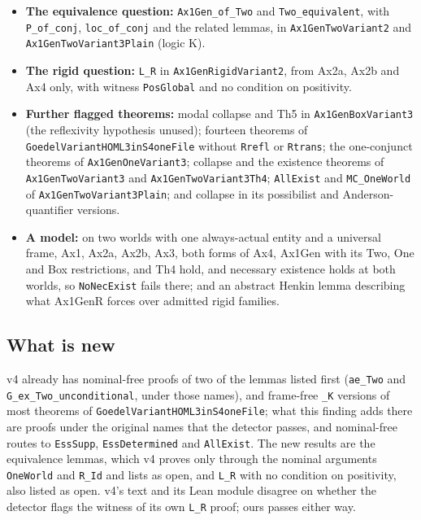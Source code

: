 \documentclass{article}
\begin{document}
\begin{itemize}
\item \textbf{The equivalence question:} \texttt{Ax1Gen\_of\_Two} and \texttt{Two\_equivalent}, with \texttt{P\_of\_conj}, \texttt{loc\_of\_conj} and the related lemmas, in \texttt{Ax1GenTwoVariant2} and \texttt{Ax1GenTwoVariant3Plain} (logic K).
\item \textbf{The rigid question:} \texttt{L\_R} in \texttt{Ax1GenRigidVariant2}, from Ax2a, Ax2b and Ax4 only, with witness \texttt{PosGlobal} and no condition on positivity.
\item \textbf{Further flagged theorems:} modal collapse and Th5 in \texttt{Ax1GenBoxVariant3} (the reflexivity hypothesis unused); fourteen theorems of \texttt{GoedelVariantHOML3inS4oneFile} without \texttt{Rrefl} or \texttt{Rtrans}; the one-conjunct theorems of \texttt{Ax1GenOneVariant3}; collapse and the existence theorems of \texttt{Ax1GenTwoVariant3} and \texttt{Ax1GenTwoVariant3Th4}; \texttt{AllExist} and \texttt{MC\_OneWorld} of \texttt{Ax1GenTwoVariant3Plain}; and collapse in its possibilist and Anderson-quantifier versions.
\item \textbf{A model:} on two worlds with one always-actual entity and a universal frame, Ax1, Ax2a, Ax2b, Ax3, both forms of Ax4, Ax1Gen with its Two, One and Box restrictions, and Th4 hold, and necessary existence holds at both worlds, so \texttt{NoNecExist} fails there; and an abstract Henkin lemma describing what Ax1GenR forces over admitted rigid families.
\end{itemize}

\subsection*{What is new}

v4 already has nominal-free proofs of two of the lemmas listed first (\texttt{ae\_Two} and
\texttt{G\_ex\_Two\_unconditional}, under those names), and frame-free \texttt{\_K} versions of most theorems of
\texttt{GoedelVariantHOML3inS4oneFile}; what this finding adds there are proofs under the original names
that the detector passes, and nominal-free routes to \texttt{EssSupp}, \texttt{EssDetermined} and \texttt{AllExist}.
The new results are the equivalence lemmas, which v4 proves only through the nominal arguments
\texttt{OneWorld} and \texttt{R\_Id} and lists as open, and \texttt{L\_R} with no condition on positivity, also listed
as open. v4's text and its Lean module disagree on whether the detector flags the witness of its
own \texttt{L\_R} proof; ours passes either way.
\end{document}
